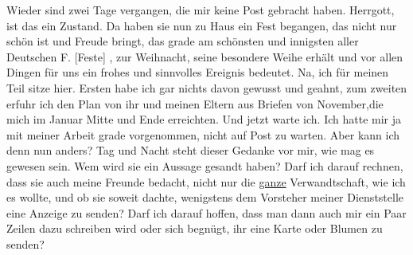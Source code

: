 \def\day{16. Februar 1943}
\mktitle

Wieder sind zwei Tage vergangen, die mir keine Post gebracht haben.
Herrgott, ist das ein Zustand.
Da haben sie nun zu Haus ein Fest begangen, das nicht nur sch\"{o}n ist und Freude bringt, das grade am sch\"{o}nsten und innigsten aller Deutschen F.{\color{red} [Feste] }, zur Weihnacht, seine besondere Weihe erh\"{a}lt und vor allen Dingen f\"{u}r uns ein frohes und sinnvolles Ereignis bedeutet.
Na, ich f\"{u}r meinen Teil sitze hier.
Ersten habe ich gar nichts davon gewusst und geahnt, zum zweiten erfuhr ich den Plan von ihr und meinen Eltern aus Briefen von November,die mich im Januar Mitte und Ende erreichten.
Und jetzt warte ich.
Ich hatte mir ja mit meiner Arbeit grade vorgenommen, nicht auf Post zu warten.
Aber kann ich denn nun anders?
Tag und Nacht steht dieser Gedanke vor mir, wie mag es gewesen sein.
Wem wird sie ein Aussage gesandt haben?
Darf ich darauf rechnen, dass sie auch meine Freunde bedacht, nicht nur die \ul{ganze} Verwandtschaft, wie ich es wollte, und ob sie soweit dachte, wenigstens dem Vorsteher meiner Dienststelle eine Anzeige zu senden?
Darf ich darauf hoffen, dass man dann auch mir ein Paar Zeilen dazu schreiben wird oder sich begn\"{u}gt, ihr eine Karte oder Blumen zu senden?
\clearpage
